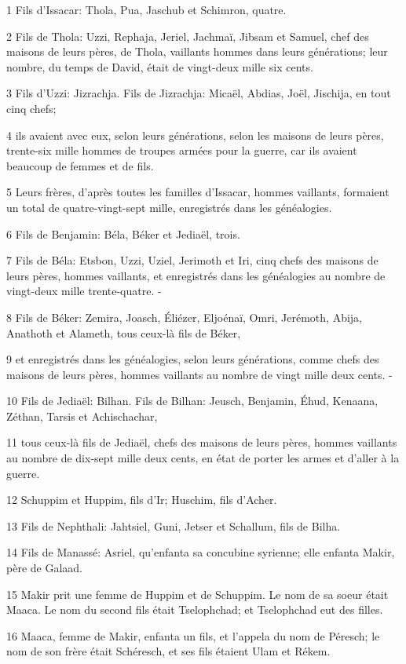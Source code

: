 \par 1 Fils d'Issacar: Thola, Pua, Jaschub et Schimron, quatre.
\par 2 Fils de Thola: Uzzi, Rephaja, Jeriel, Jachmaï, Jibsam et Samuel, chef des maisons de leurs pères, de Thola, vaillants hommes dans leurs générations; leur nombre, du temps de David, était de vingt-deux mille six cents.
\par 3 Fils d'Uzzi: Jizrachja. Fils de Jizrachja: Micaël, Abdias, Joël, Jischija, en tout cinq chefs;
\par 4 ils avaient avec eux, selon leurs générations, selon les maisons de leurs pères, trente-six mille hommes de troupes armées pour la guerre, car ils avaient beaucoup de femmes et de fils.
\par 5 Leurs frères, d'après toutes les familles d'Issacar, hommes vaillants, formaient un total de quatre-vingt-sept mille, enregistrés dans les généalogies.
\par 6 Fils de Benjamin: Béla, Béker et Jediaël, trois.
\par 7 Fils de Béla: Etsbon, Uzzi, Uziel, Jerimoth et Iri, cinq chefs des maisons de leurs pères, hommes vaillants, et enregistrés dans les généalogies au nombre de vingt-deux mille trente-quatre. -
\par 8 Fils de Béker: Zemira, Joasch, Éliézer, Eljoénaï, Omri, Jerémoth, Abija, Anathoth et Alameth, tous ceux-là fils de Béker,
\par 9 et enregistrés dans les généalogies, selon leurs générations, comme chefs des maisons de leurs pères, hommes vaillants au nombre de vingt mille deux cents. -
\par 10 Fils de Jediaël: Bilhan. Fils de Bilhan: Jeusch, Benjamin, Éhud, Kenaana, Zéthan, Tarsis et Achischachar,
\par 11 tous ceux-là fils de Jediaël, chefs des maisons de leurs pères, hommes vaillants au nombre de dix-sept mille deux cents, en état de porter les armes et d'aller à la guerre.
\par 12 Schuppim et Huppim, fils d'Ir; Huschim, fils d'Acher.
\par 13 Fils de Nephthali: Jahtsiel, Guni, Jetser et Schallum, fils de Bilha.
\par 14 Fils de Manassé: Asriel, qu'enfanta sa concubine syrienne; elle enfanta Makir, père de Galaad.
\par 15 Makir prit une femme de Huppim et de Schuppim. Le nom de sa soeur était Maaca. Le nom du second fils était Tselophchad; et Tselophchad eut des filles.
\par 16 Maaca, femme de Makir, enfanta un fils, et l'appela du nom de Péresch; le nom de son frère était Schéresch, et ses fils étaient Ulam et Rékem.
